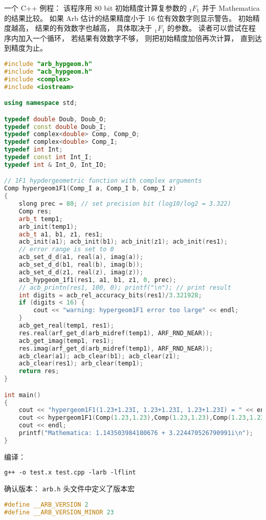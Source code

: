 一个 C++ 例程： 该程序用 80 bit 初始精度计算复参数的 $_1F_1$ 并于 Mathematica 的结果比较。 如果 Arb 估计的结果精度小于 16 位有效数字则显示警告。 初始精度越高， 结果的有效数字也越高， 具体取决于 $_1F_1$ 的参数。 读者可以尝试在程序内加入一个循环， 若结果有效数字不够， 则把初始精度加倍再次计算， 直到达到精度为止。

\begin{lstlisting}[language=cpp, caption=test.cpp]
#include "arb_hypgeom.h"
#include "acb_hypgeom.h"
#include <complex>
#include <iostream>

using namespace std;

typedef double Doub, Doub_O;
typedef const double Doub_I;
typedef complex<double> Comp, Comp_O;
typedef complex<double> Comp_I;
typedef int Int;
typedef const int Int_I;
typedef int & Int_O, Int_IO;

// 1F1 hypdergeometric function with complex arguments
Comp hypergeom1F1(Comp_I a, Comp_I b, Comp_I z)
{
	slong prec = 80; // set precision bit (log10/log2 = 3.322)
	Comp res;
	arb_t temp1;
	arb_init(temp1);
	acb_t a1, b1, z1, res1;
	acb_init(a1); acb_init(b1); acb_init(z1); acb_init(res1);
	// error range is set to 0
	acb_set_d_d(a1, real(a), imag(a));
	acb_set_d_d(b1, real(b), imag(b));
	acb_set_d_d(z1, real(z), imag(z));
	acb_hypgeom_1f1(res1, a1, b1, z1, 0, prec);
	// acb_printn(res1, 100, 0); printf("\n"); // print result
	int digits = acb_rel_accuracy_bits(res1)/3.321928;
	if (digits < 16) {
		cout << "warning: hypergeom1F1 error too large" << endl;
	}
	acb_get_real(temp1, res1);
	res.real(arf_get_d(arb_midref(temp1), ARF_RND_NEAR));
	acb_get_imag(temp1, res1);
	res.imag(arf_get_d(arb_midref(temp1), ARF_RND_NEAR));
	acb_clear(a1); acb_clear(b1); acb_clear(z1);
    acb_clear(res1); arb_clear(temp1);
	return res;
}

int main()
{
	cout << "hypergeom1F1(1.23+1.23I, 1.23+1.23I, 1.23+1.23I) = " << endl;
	cout << hypergeom1F1(Comp(1.23,1.23),Comp(1.23,1.23),Comp(1.23,1.23))
    cout << endl;
	printf("Mathematica: 1.143503984180676 + 3.224470526790991i\n");
}
\end{lstlisting}
编译：
\begin{lstlisting}[language=makefile]
g++ -o test.x test.cpp -larb -lflint
\end{lstlisting}

确认版本： \verb`arb.h` 头文件中定义了版本宏
\begin{lstlisting}[language=cpp]
#define __ARB_VERSION 2
#define __ARB_VERSION_MINOR 23
\end{lstlisting}


